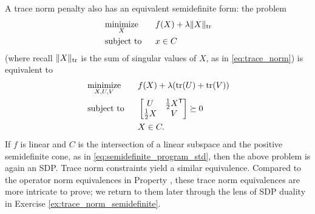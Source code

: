 A trace norm penalty also has an equivalent semidefinite form: the problem    
\begin{alignat*}{2}
&\operatorname*{minimize}_X \quad && f(X) + \lambda \|X\|_{\operatorname{tr}} \\
&\operatorname{subject\,\,to} && x \in C
\end{alignat*}
(where recall $\|X\|_{\operatorname{tr}}$ is the sum of singular values of $X$, as in  
\eqref{eq:trace_norm}) is equivalent to 
\begin{alignat*}{2}
&\operatorname*{minimize}_{X,U,V} \quad && f(X) + \lambda(\operatorname{tr}(U) + \operatorname{tr}(V)) \\ 
&\operatorname{subject\,\,to} && \begin{bmatrix} U & \frac{1}{2} X^{\mathsf{T}} \\ 
\frac{1}{2} X & V \end{bmatrix} \succeq 0 \\
& && X \in C.
\end{alignat*}  
If $f$ is linear and $C$ is the intersection of a linear subspace and the
positive semidefinite cone, as in \eqref{eq:semidefinite_program_std}, then the
above problem is again an SDP. Trace norm constraints yield a similar
equivalence. Compared to the operator norm equivalences in Property
, these trace norm equivalences are more
intricate to prove; we return to them later through the lens of SDP duality in
Exercise \ref{ex:trace_norm_semidefinite}.

\medskip



